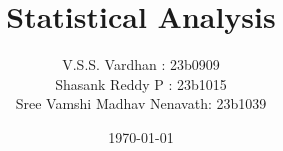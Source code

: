 \documentclass[openany]{book}
\title{Statistical Analysis}
\date{\today}
\author{
	V.S.S. Vardhan : 23b0909 \\
	Shasank Reddy P : 23b1015 \\
	Sree Vamshi Madhav Nenavath: 23b1039 \\
}
\begin{document}
	
	\maketitle
	\tableofcontents

    \theoremstyle{plain}
	\newtheorem{theorem}{Theorem}
    \newtheorem{lemma}{Lemma}
	

	
	



    
	
	
\end{document}
